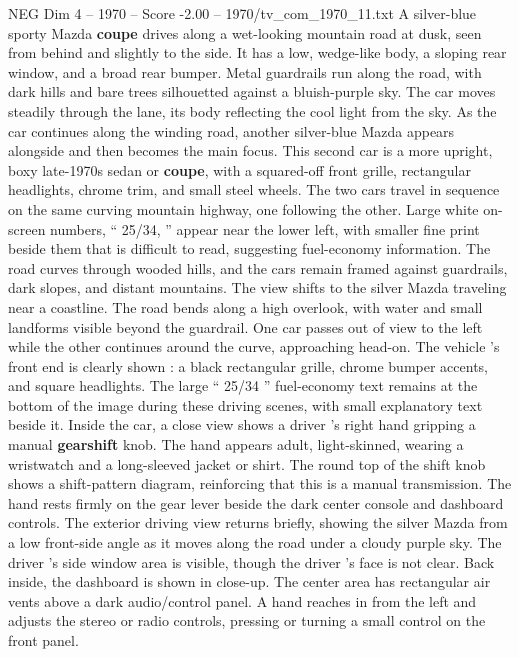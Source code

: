\begin{textsample}{NEG Dim 4 – 1970 – Score -2.00 – 1970/tv\_com\_1970\_11.txt}  \label{ex:f4_neg_003}
A silver-blue sporty Mazda \textbf{coupe} drives along a wet-looking mountain road at dusk, seen from behind and slightly to the side.
It has a low, wedge-like body, a sloping rear window, and a broad rear bumper.
Metal guardrails run along the road, with dark hills and bare trees silhouetted against a bluish-purple sky.
The car moves steadily through the lane, its body reflecting the cool light from the sky.
As the car continues along the winding road, another silver-blue Mazda appears alongside and then becomes the main focus.
This second car is a more upright, boxy late-1970s sedan or \textbf{coupe}, with a squared-off front grille, rectangular headlights, chrome trim, and small steel wheels.
The two cars travel in sequence on the same curving mountain highway, one following the other.
Large white on-screen numbers, “ 25/34, ” appear near the lower left, with smaller fine print beside them that is difficult to read, suggesting fuel-economy information.
The road curves through wooded hills, and the cars remain framed against guardrails, dark slopes, and distant mountains.
The view shifts to the silver Mazda traveling near a coastline.
The road bends along a high overlook, with water and small landforms visible beyond the guardrail.
One car passes out of view to the left while the other continues around the curve, approaching head-on.
The vehicle ’s front end is clearly shown : a black rectangular grille, chrome bumper accents, and square headlights.
The large “ 25/34 ” fuel-economy text remains at the bottom of the image during these driving scenes, with small explanatory text beside it.
Inside the car, a close view shows a driver ’s right hand gripping a manual \textbf{gearshift} knob.
The hand appears adult, light-skinned, wearing a wristwatch and a long-sleeved jacket or shirt.
The round top of the shift knob shows a shift-pattern diagram, reinforcing that this is a manual transmission.
The hand rests firmly on the gear lever beside the dark center console and dashboard controls.
The exterior driving view returns briefly, showing the silver Mazda from a low front-side angle as it moves along the road under a cloudy purple sky.
The driver ’s side window area is visible, though the driver ’s face is not clear.
Back inside, the dashboard is shown in close-up.
The center area has rectangular air vents above a dark audio/control panel.
A hand reaches in from the left and adjusts the stereo or radio controls, pressing or turning a small control on the front panel.

\end{textsample}
